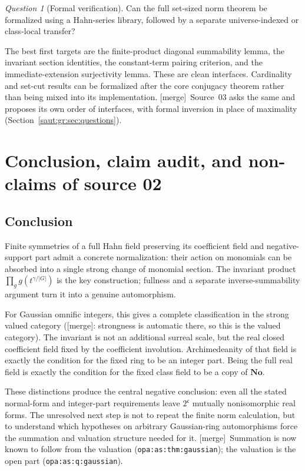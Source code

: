 \documentclass[11pt]{article}
\theoremstyle{definition}
\theoremstyle{remark}
\newtheorem{question}[theorem]{Question}
\newcommand{\No}{\mathbf{No}}
\newcommand{\lbl}[1]{\nolinkurl{#1}}%
\newcommand{\cc}{\mathfrak c}
\newcommand{\mergetag}{\textup{[merge]}}
\numberwithin{equation}{section}
\begin{document}
\begin{question}[Formal verification]\label{saut:fs:q:formal}
Can the full set-sized norm theorem be formalized using a Hahn-series library,
followed by a separate universe-indexed or class-local transfer?
\end{question}
The best first targets are the finite-product diagonal summability lemma, the
invariant section identities, the constant-term pairing criterion, and the
immediate-extension surjectivity lemma. These are clean interfaces. Cardinality and
set-cut results can be formalized after the core conjugacy theorem rather than being
mixed into its implementation. \mergetag\ Source~03 asks the same and proposes its own order
of interfaces, with formal inversion in place of maximality
(Section~\ref{saut:gr:sec:questions}).

\section{Conclusion, claim audit, and non-claims of source 02}\label{saut:fs:sec:closing}

\subsection{Conclusion}

Finite symmetries of a full Hahn field preserving its coefficient field and
negative-support part admit a concrete normalization: their action on monomials can be
absorbed into a single strong change of monomial section. The invariant product
$\prod_g g(t^{\gamma/|G|})$ is the key construction; fullness and a separate
inverse-summability argument turn it into a genuine automorphism.

For Gaussian omnific integers, this gives a complete classification in the strong
valued category (\mergetag: strongness is automatic there, so this is the valued
category). The invariant is not an additional
surreal scale, but the real closed coefficient field fixed by the coefficient
involution. Archimedeanity of that field is exactly the condition for the fixed ring to
be an integer part. Being the full real field is exactly the condition for the fixed
class field to be a copy of $\No$.

These distinctions produce the central negative conclusion: even all the stated
normal-form and integer-part requirements leave $2^{\cc}$ mutually nonisomorphic real
forms. The unresolved next step is not to repeat the finite norm calculation, but to
understand which hypotheses on arbitrary Gaussian-ring automorphisms force the
summation and valuation structure needed for it. \mergetag\ Summation is now known to
follow from the valuation (\lbl{opa:as:thm:gaussian}); the valuation is the open part
(\lbl{opa:as:q:gaussian}).
\end{document}
